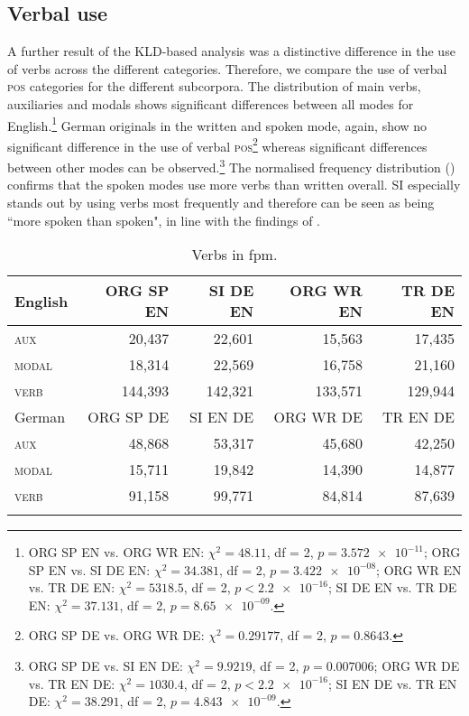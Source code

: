 \documentclass[output=paper,colorlinks,citecolor=brown]{langscibook}
\begin{document}
\subsection{Verbal use}
A further result of the KLD-based analysis was a distinctive difference in the use of verbs across the different categories. Therefore, we compare the use of verbal \textsc{pos} categories for the different subcorpora. The distribution of main verbs, auxiliaries and modals shows significant differences between all modes for English.\footnote{ORG SP EN vs. ORG WR EN: $\chi^2 = 48.11$, df = 2, $p = \num{3.572e-11}$; ORG SP EN vs. SI DE EN: $\chi^2 = 34.381$, df = 2, $p = \num{3.422e-08}$; ORG WR EN vs. TR DE EN: $\chi^2 = 5318.5$, df = 2, $p < \num{2.2e-16}$; SI DE EN vs. TR DE EN: $\chi^2 = 37.131$, df = 2, $p = \num{8.65e-09}$.} German originals in the written and spoken mode, again, show no significant difference in the use of verbal \textsc{pos}\footnote{ORG SP DE vs. ORG WR DE: $\chi^2 = 0.29177$, df = 2, $p= 0.8643$.} whereas significant differences between other modes can be observed.\footnote{ORG SP DE vs. SI EN DE: $\chi^2 = 9.9219$, df = 2, $p = 0.007006$; ORG WR DE vs. TR EN DE: $\chi^2 = 1030.4$, df = 2, $p < \num{2.2e-16}$; SI EN DE vs. TR EN DE: $\chi^2 = 38.291$, df = 2, $p = \num{4.843e-09}$.} The normalised frequency distribution () confirms that the spoken modes use more verbs than written overall. SI especially stands out by using verbs most frequently and therefore can be seen as being “more spoken than spoken", in line with the findings of \citet{ShlesingerOrdan2012}. 

\begin{table}
\begin{tabular}{lrrrr}
\lsptoprule
English & ORG SP EN & SI DE EN & ORG WR EN & TR DE EN \\\midrule
\textsc{aux} & 20,437 & 22,601 & 15,563 & 17,435 \\
\textsc{modal} & 18,314 & 22,569 & 16,758 & 21,160 \\
\textsc{verb} & 144,393 & 142,321 & 133,571  & 129,944 \\\midrule

German & ORG SP DE & SI EN DE & ORG WR DE & TR EN DE \\\midrule
\textsc{aux} & 48,868 & 53,317 &	45,680 & 42,250 \\
\textsc{modal} & 15,711 & 19,842 & 14,390 & 14,877 \\
\textsc{verb} & 91,158 & 99,771 & 84,814 & 87,639\\
\lspbottomrule
\end{tabular}
\caption{\label{tab:verb_fpm}Verbs in fpm.}
\end{table}
\end{document}
